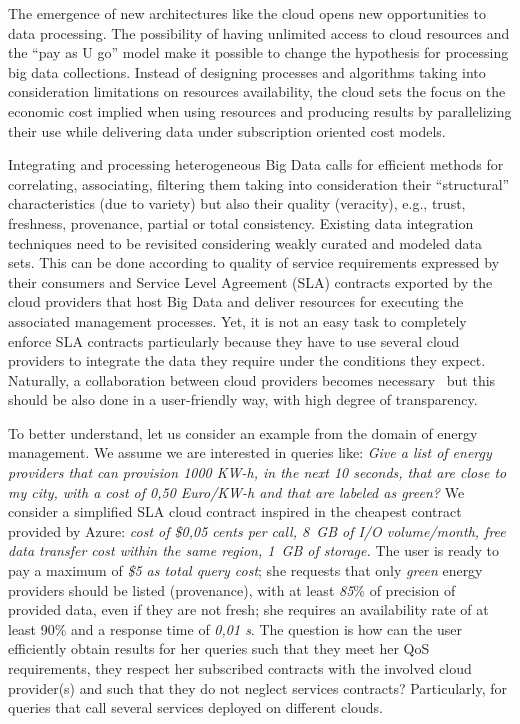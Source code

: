 The emergence of new architectures like the cloud opens new opportunities to data processing. 
The possibility of having unlimited access to cloud resources and the ``pay as U go'' model make it possible to change the hypothesis for processing big  data collections.  Instead of designing processes and algorithms taking into consideration  limitations on resources availability, the cloud sets the focus on the economic cost implied when using resources and producing results by parallelizing their use while delivering data under subscription oriented cost models.
 
Integrating and processing heterogeneous Big Data calls for efficient methods for correlating, associating, filtering them taking into consideration their ``structural'' characteristics (due to variety) but also their quality (veracity), e.g., trust, freshness, provenance, partial or total consistency. 
Existing data integration techniques need to be revisited considering weakly curated and modeled data sets. This can be done according to quality of service requirements expressed by their consumers and Service Level Agreement (SLA) contracts exported by the cloud providers that host  Big Data and deliver resources for executing the associated management processes. Yet, it is not an easy task to completely enforce SLA contracts particularly because they have to use several cloud providers to integrate the data they require under the conditions they expect.
Naturally, a collaboration between cloud providers becomes necessary~\cite{036} but this should be also done in a user-friendly way, with high degree of transparency. 

To better understand, let us consider an example from the domain of energy
management. We assume we are interested in queries like: \textit{Give a list
of energy providers that can provision 1000 KW-h, in the next 10 seconds, that are close to my city, with a cost of 0,50 Euro/KW-h and that are labeled as green?} We consider a simplified SLA cloud contract inspired in the cheapest contract provided by Azure: \textit{cost of \$0,05 cents per call,  8~GB of I/O volume/month, free data transfer cost within the same region,  1~GB of storage.} 
The user is ready to pay a maximum of \textit{\$5 as total query cost}; she requests that only  \textit{green} energy providers should be  listed (provenance), with at least  \textit{85$\%$} of precision of provided data, even if they are not fresh; she requires an availability rate of at least 90$\%$ and a response time of  \textit{0,01 s}. 
  The question is how can the user efficiently obtain  results for her queries such that they meet her QoS requirements, they respect her subscribed contracts with the involved cloud provider(s) and such that they do not neglect services contracts? Particularly, for queries that call several services deployed  on different clouds.

